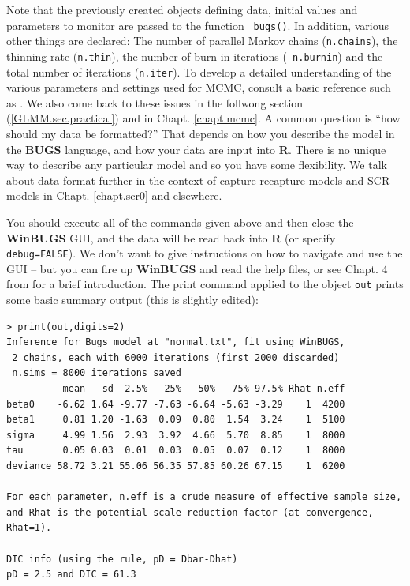 Note that the previously created objects defining data, initial values
and parameters to monitor are passed to the function \mbox{\tt
  bugs()}.  In addition, various other things are declared: The number
of parallel Markov chains (\mbox{\tt n.chains}), the thinning rate
(\mbox{\tt n.thin}), the number of burn-in iterations (\mbox{\tt
  n.burnin}) and the total number of iterations (\mbox{\tt n.iter}).
To develop a detailed understanding of the various parameters and
settings used for MCMC, consult a basic reference such as
\citet{kery:2010}. We also come back to these issues in the follwong
section (\ref{GLMM.sec.practical}) and in Chapt. \ref{chapt.mcmc}.
A common question is ``how should my data be formatted?'' That depends
on how you describe the model in the {\bf BUGS} language, and how your
data are input into {\bf R}. There is no unique way to describe any
particular model and so you have some flexibility. We talk about data
format further in the context of capture-recapture models and SCR
models in Chapt. \ref{chapt.scr0} and elsewhere. 


You should execute all of the commands given above and then
close the {\bf WinBUGS} GUI, and the data will be
read back into {\bf R} (or specify \mbox{\tt debug=FALSE}).  We don't
want to give instructions on how to navigate and use the GUI -- but you
can fire up {\bf WinBUGS} and read the help files, or see Chapt. 4 from
\citet{kery:2010} for a brief introduction.
The print command applied to the object \mbox{\tt out} prints some
basic summary output (this is slightly edited):

{\small
\begin{verbatim}
> print(out,digits=2)
Inference for Bugs model at "normal.txt", fit using WinBUGS,
 2 chains, each with 6000 iterations (first 2000 discarded)
 n.sims = 8000 iterations saved
          mean   sd  2.5%   25%   50%   75% 97.5% Rhat n.eff
beta0    -6.62 1.64 -9.77 -7.63 -6.64 -5.63 -3.29    1  4200
beta1     0.81 1.20 -1.63  0.09  0.80  1.54  3.24    1  5100
sigma     4.99 1.56  2.93  3.92  4.66  5.70  8.85    1  8000
tau       0.05 0.03  0.01  0.03  0.05  0.07  0.12    1  8000
deviance 58.72 3.21 55.06 56.35 57.85 60.26 67.15    1  6200

For each parameter, n.eff is a crude measure of effective sample size,
and Rhat is the potential scale reduction factor (at convergence, Rhat=1).

DIC info (using the rule, pD = Dbar-Dhat)
pD = 2.5 and DIC = 61.3
\end{verbatim}
}

